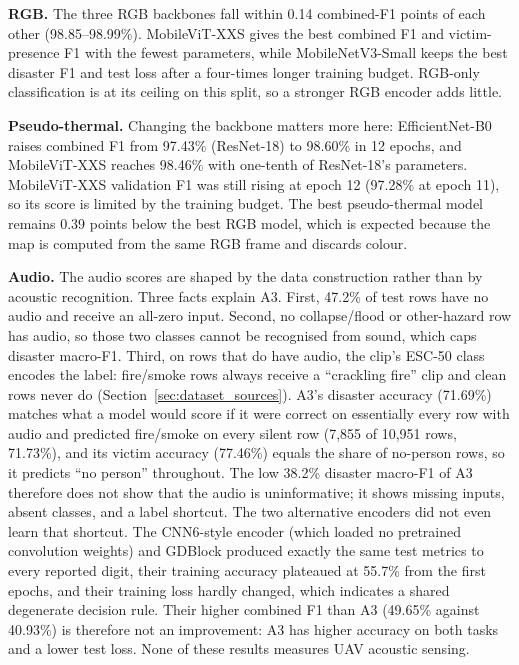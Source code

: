 \textbf{RGB.} The three RGB backbones fall within 0.14 combined-F1 points of each other (98.85--98.99\%). MobileViT-XXS gives the best combined F1 and victim-presence F1 with the fewest parameters, while MobileNetV3-Small keeps the best disaster F1 and test loss after a four-times longer training budget. RGB-only classification is at its ceiling on this split, so a stronger RGB encoder adds little.

\textbf{Pseudo-thermal.} Changing the backbone matters more here: EfficientNet-B0 raises combined F1 from 97.43\% (ResNet-18) to 98.60\% in 12 epochs, and MobileViT-XXS reaches 98.46\% with one-tenth of ResNet-18's parameters. MobileViT-XXS validation F1 was still rising at epoch 12 (97.28\% at epoch 11), so its score is limited by the training budget. The best pseudo-thermal model remains 0.39 points below the best RGB model, which is expected because the map is computed from the same RGB frame and discards colour.

\textbf{Audio.} The audio scores are shaped by the data construction rather than by acoustic recognition. Three facts explain A3. First, 47.2\% of test rows have no audio and receive an all-zero input. Second, no collapse/flood or other-hazard row has audio, so those two classes cannot be recognised from sound, which caps disaster macro-F1. Third, on rows that do have audio, the clip's ESC-50 class encodes the label: fire/smoke rows always receive a ``crackling fire'' clip and clean rows never do (Section~\ref{sec:dataset_sources}). A3's disaster accuracy (71.69\%) matches what a model would score if it were correct on essentially every row with audio and predicted fire/smoke on every silent row (7{,}855 of 10{,}951 rows, 71.73\%), and its victim accuracy (77.46\%) equals the share of no-person rows, so it predicts ``no person'' throughout. The low 38.2\% disaster macro-F1 of A3 therefore does not show that the audio is uninformative; it shows missing inputs, absent classes, and a label shortcut. The two alternative encoders did not even learn that shortcut. The CNN6-style encoder (which loaded no pretrained convolution weights) and GDBlock produced exactly the same test metrics to every reported digit, their training accuracy plateaued at 55.7\% from the first epochs, and their training loss hardly changed, which indicates a shared degenerate decision rule. Their higher combined F1 than A3 (49.65\% against 40.93\%) is therefore not an improvement: A3 has higher accuracy on both tasks and a lower test loss. None of these results measures UAV acoustic sensing.

